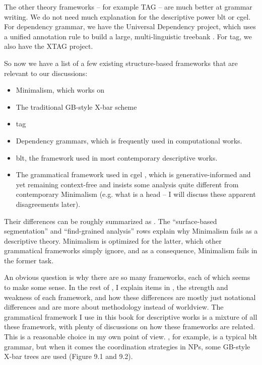 \documentclass[../main.tex]{subfiles}
\begin{document}
The other theory frameworks -- for example TAG -- are much better at grammar writing. 
We do not need much explanation for the descriptive power \ac{blt} or \ac{cgel}. 
For dependency grammar, we have the Universal Dependency project, 
which uses a unified annotation rule to build a large, multi-linguistic treebank \citep{ud}.
For \ac{tag}, we also have the XTAG project. %

So now we have a list of a few existing structure-based frameworks that are relevant to our discussions:
\begin{itemize}
    \item Minimalism, which works on 
    \item The traditional GB-style X-bar scheme
    \item \ac{tag}  %
    \item Dependency grammars, which is frequently used in computational works.
    \item \ac{blt}, the framework used in most contemporary descriptive works.
    \item The grammatical framework used in \ac{cgel} \citep{cgel,pullum2008expressive}, which is generative-informed and yet remaining 
    context-free and insists some analysis quite different from contemporary Minimalism (e.g. 
    what is a head -- I will discuss these apparent disagreements later).
\end{itemize}
Their differences can be roughly summarized as . 
The ``surface-based segmentation'' and ``find-grained analysis'' rows explain why Minimalism fails as a 
descriptive theory. Minimalism is optimized for the latter, which other grammatical frameworks 
simply ignore, and as a consequence, Minimalism fails in the former task.

An obvious question is why there are so many frameworks, each of which seems to make some sense. 
In the rest of , 
I explain items in , 
the strength and weakness of each framework, 
and how these differences are mostly just notational differences 
and are more about methodology instead of worldview. 
The grammatical framework I use in this book for descriptive works is a mixture of all these framework,
with plenty of discussions on how these frameworks are related.
This is a reasonable choice in my own point of view. 
\citet{jacques2021grammar}, for example, is a typical \ac{blt} grammar, 
but when it comes the coordination strategies in NPs, 
some GB-style X-bar trees are used (Figure 9.1 and 9.2).
\end{document}
